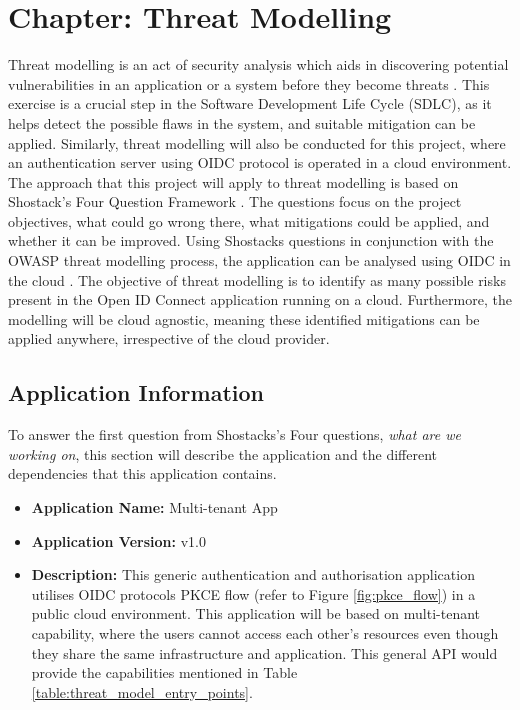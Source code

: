 \chapter{Chapter: Threat Modelling}
\label{chap:threat_model}
Threat modelling is an act of security analysis which aids in discovering potential vulnerabilities in an application or a system before they become threats \citep{threat_model_intro}. This exercise is a crucial step in the Software Development Life Cycle (SDLC), as it helps detect the possible flaws in the system, and suitable mitigation can be applied. Similarly, threat modelling will also be conducted for this project, where an authentication server using OIDC protocol is operated in a cloud environment. The approach that this project will apply to threat modelling is based on Shostack's Four Question Framework \citep{shostack}. The questions focus on the project objectives, what could go wrong there, what mitigations could be applied, and whether it can be improved. Using Shostacks questions in conjunction with the OWASP threat modelling process, the application can be analysed using OIDC in the cloud \citep{owasp_threat_model}. The objective of threat modelling is to identify as many possible risks present in the Open ID Connect application running on a cloud. Furthermore, the modelling will be cloud agnostic, meaning these identified mitigations can be applied anywhere, irrespective of the cloud provider.

\section{Application Information}
To answer the first question from Shostacks's Four questions, \textit{what are we working on}, this section will describe the application and the different dependencies that this application contains.
\newline
\begin{itemize}
    \item \textbf{Application Name:} Multi-tenant App
    \item \textbf{Application Version:} v1.0
    \item \textbf{Description:} This generic authentication and authorisation application utilises OIDC protocols PKCE flow (refer to Figure \ref{fig:pkce_flow}) in a public cloud environment. This application will be based on multi-tenant capability, where the users cannot access each other's resources even though they share the same infrastructure and application. This general API would provide the capabilities mentioned in Table \ref{table:threat_model_entry_points}.
  \end{itemize}

